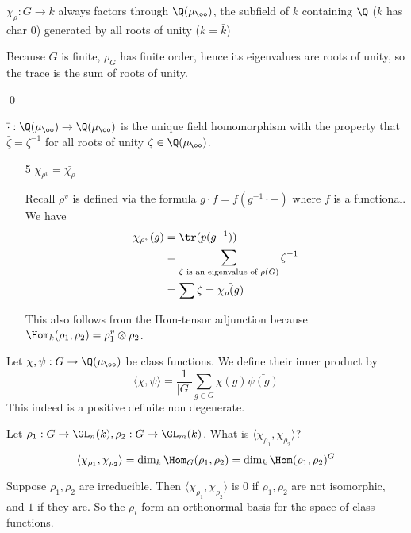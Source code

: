 \documentclass[x11names,reqno,14pt]{extarticle}
\begin{document}
\claim

$\chi_\rho:G\to k$ always factors through $\Q(\mu_\oo)$, the subfield of $k$ containing $\Q$ ($k$ has char 0) generated by all roots of unity ($k = \bar{k}$)

\proof

Because $G$ is finite, $\rho_G$ has finite order, hence its eigenvalues are roots of unity, so the trace is the sum of roots of unity. 

\qed


$\bar{\cdot}:\Q(\mu_\oo) \to \Q(\mu_\oo)$  is the unique field homomorphism with the property that $\bar{\zeta} = \zeta^{-1}$ for all roots of unity $\zeta \in \Q(\mu_\oo)$. 

\begin{enumerate}

\item[5] $\chi_{\rho^v}= \bar{\chi_\rho}$

Recall $\rho^v$ is defined via the formula $g\cdot f = f(g^{-1}\cdot -)$ where $f$ is a functional. We have 
\begin{align*}
\chi_{\rho^v}(g) & = \tr(p(g^{-1})) \\
& = \sum_{\zeta\text{ is an eigenvalue of }\rho(G)}\zeta^{-1} \\
& = \sum \bar{\zeta} = \bar{\chi_\rho(g)}
\end{align*}

This also follows from the Hom-tensor adjunction because $\Hom_k(\rho_1,\rho_2) = \rho_1^v\otimes\rho_2$. 

\end{enumerate}


Let $\chi,\psi:G\to \Q(\mu_\oo)$ be class functions. We define their inner product by 
\[
\langle\chi,\psi\rangle = \frac{1}{|G|}\sum_{g\in G}\chi(g)\bar{\psi(g)}
\] 
This indeed is a positive definite non degenerate. 

Let $\rho_1:G\to\GL_n(k), \rho_2:G\to\GL_m(k)$. What is $\langle\chi_{\rho_1},\chi_{\rho_2}\rangle$? 
\thm
\[
\langle\chi_{\rho_1},\chi_{\rho_2}\rangle = \dim_k\Hom_G(\rho_1,\rho_2) = \dim_k\Hom(\rho_1,\rho_2)^G
\]

\cor

Suppose $\rho_1,\rho_2$ are irreducible. Then $\langle\chi_{\rho_1},\chi_{\rho_2}\rangle$ is 0 if $\rho_1,\rho_2$ are not isomorphic, and $1$ if they are. So the $\rho_i$ form an orthonormal basis for the space of class functions. 
\end{document}
